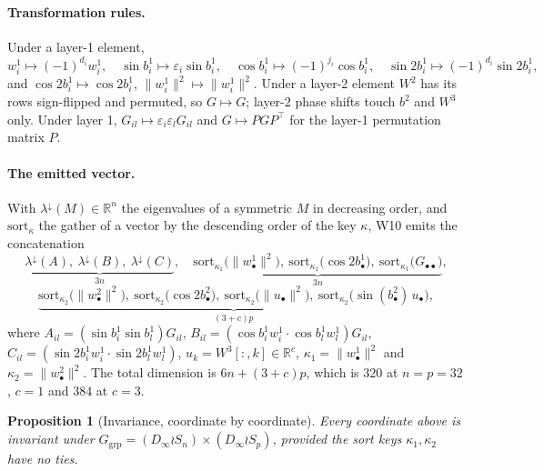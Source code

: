 \documentclass[10pt,letterpaper]{article}
\newtheorem{proposition}[theorem]{Proposition}
\theoremstyle{definition}
\newcommand{\R}{\mathbb{R}}
\newcommand{\Dinf}{D_\infty}
\begin{document}
\paragraph{Transformation rules.} Under a layer-1 element,
\[
w^1_i \mapsto (-1)^{d_i} w^1_i, \quad
\sin b^1_i \mapsto \varepsilon_i \sin b^1_i, \quad
\cos b^1_i \mapsto (-1)^{j_i}\cos b^1_i, \quad
\sin 2b^1_i \mapsto (-1)^{d_i}\sin 2b^1_i,
\]
and $\cos 2b^1_i \mapsto \cos 2b^1_i$, $\|w^1_i\|^2 \mapsto \|w^1_i\|^2$. Under a layer-2 element
$W^2$ has its rows sign-flipped and permuted, so $G \mapsto G$; layer-2 phase shifts touch $b^2$
and $W^3$ only. Under layer 1, $G_{il} \mapsto \varepsilon_i\varepsilon_l G_{il}$ and
$G \mapsto PGP^\top$ for the layer-1 permutation matrix $P$.

\paragraph{The emitted vector.} With $\lambda^{\downarrow}(M) \in \R^n$ the eigenvalues of a
symmetric $M$ in decreasing order, and $\mathrm{sort}_{\kappa}$ the gather of a vector by the
descending order of the key $\kappa$, W10 emits the concatenation
\[
\underbrace{\lambda^{\downarrow}(A),\ \lambda^{\downarrow}(B),\ \lambda^{\downarrow}(C)}_{3n},\quad
\underbrace{\mathrm{sort}_{\kappa_1}\big(\|w^1_\bullet\|^2\big),\
\mathrm{sort}_{\kappa_1}\big(\cos 2b^1_\bullet\big),\
\mathrm{sort}_{\kappa_1}\big(G_{\bullet\bullet}\big)}_{3n},
\]
\[
\underbrace{\mathrm{sort}_{\kappa_2}\big(\|w^2_\bullet\|^2\big),\
\mathrm{sort}_{\kappa_2}\big(\cos 2b^2_\bullet\big),\
\mathrm{sort}_{\kappa_2}\big(\|u_\bullet\|^2\big),\
\mathrm{sort}_{\kappa_2}\big(\sin(b^2_\bullet)\,u_\bullet\big)}_{(3+c)p},
\]
where $A_{il} = (\sin b^1_i \sin b^1_l)G_{il}$,
$B_{il} = (\cos b^1_i w^1_i \cdot \cos b^1_l w^1_l)G_{il}$,
$C_{il} = (\sin 2b^1_i w^1_i \cdot \sin 2b^1_l w^1_l)$, $u_k = W^3[:,k] \in \R^c$,
$\kappa_1 = \|w^1_\bullet\|^2$ and $\kappa_2 = \|w^2_\bullet\|^2$. The total dimension is
$6n + (3+c)p$, which is $320$ at $n=p=32$, $c=1$ and $384$ at $c=3$.

\begin{proposition}[Invariance, coordinate by coordinate]
Every coordinate above is invariant under $G_{\mathrm{grp}} = (\Dinf \wr S_n)\times(\Dinf \wr S_p)$,
provided the sort keys $\kappa_1,\kappa_2$ have no ties.
\end{proposition}
\end{document}
